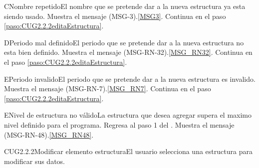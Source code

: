 	\begin{UCtrayectoriaA}{C}{Nombre repetido}{El nombre que se pretende dar a la nueva estructura ya esta siendo usado.}
		\UCpaso Muestra el mensaje (MSG-3).\ref{MSG3}.
		\UCpaso Continua en el paso \ref{paso:CUG2.2.2editaEstructura}.
	\end{UCtrayectoriaA}

	\begin{UCtrayectoriaA}{D}{Periodo mal definido}{El periodo que se pretende dar a la nueva estructura no esta bien definido.}
		\UCpaso Muestra el mensaje (MSG-RN-32).\ref{MSG_RN32}.
		\UCpaso Continua en el paso \ref{paso:CUG2.2.2editaEstructura}.
	\end{UCtrayectoriaA}

	\begin{UCtrayectoriaA}{E}{Periodo invalido}{El periodo que se pretende dar a la nueva estructura es invalido.}
		\UCpaso Muestra el mensaje (MSG-RN-7).\ref{MSG_RN7}.
		\UCpaso Continua en el paso \ref{paso:CUG2.2.2editaEstructura}.
	\end{UCtrayectoriaA}

	\begin{UCtrayectoriaA}{E}{Nivel de estructura no válido}{La estructura que desea agregar supera el maximo nivel definido para el programa.}
		\UCpaso Regresa al paso 1 del .
		\UCpaso Muestra el mensaje (MSG-RN-48).\ref{MSG_RN48}.
	\end{UCtrayectoriaA}

	\begin{UseCase}{CUG2.2.2}{Modificar elemento estructura}{El usuario selecciona una estructura para modificar sus datos.}
	\end{UseCase}

